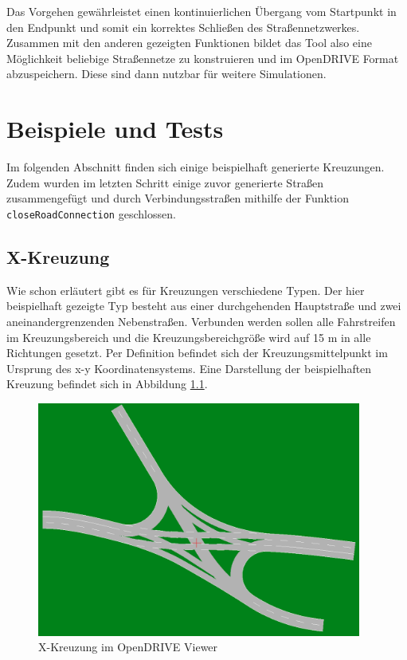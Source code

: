 Das Vorgehen gewährleistet einen kontinuierlichen Übergang vom Startpunkt in den Endpunkt und somit ein korrektes Schließen des Straßennetzwerkes. Zusammen mit den anderen gezeigten Funktionen bildet das Tool also eine Möglichkeit beliebige Straßennetze zu konstruieren und im OpenDRIVE Format abzuspeichern. Diese sind dann nutzbar für weitere Simulationen.

\chapter{Beispiele und Tests}

Im folgenden Abschnitt finden sich einige beispielhaft generierte Kreuzungen. Zudem wurden im letzten Schritt einige zuvor generierte Straßen zusammengefügt und durch Verbindungsstraßen mithilfe der Funktion \texttt{closeRoadConnection} geschlossen.

\section{X-Kreuzung}
Wie schon erläutert gibt es für Kreuzungen verschiedene Typen. Der hier beispielhaft gezeigte Typ besteht aus einer durchgehenden Hauptstraße und zwei aneinandergrenzenden Nebenstraßen. Verbunden werden sollen alle Fahrstreifen im Kreuzungsbereich und die Kreuzungsbereichgröße wird auf 15 m in alle Richtungen gesetzt. Per Definition befindet sich der Kreuzungsmittelpunkt im Ursprung des x-y Koordinatensystems. Eine Darstellung der beispielhaften Kreuzung befindet sich in Abbildung \ref{abb6}.

\begin{figure}[H]
\flushleft
\includegraphics[width=0.95\textwidth]{fig/fig6.png}
\caption{X-Kreuzung im OpenDRIVE Viewer}
\label{abb6}
\end{figure}

